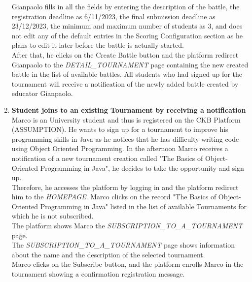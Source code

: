 \begin{enumerate}
		Gianpaolo fills in all the fields by entering the description of the battle, the registration deadline as 6/11/2023, the final submission deadline as 23/12/2023, the minimum
		and maximum number of students as 3, and does not edit any of the default entries in the Scoring Configuration section as he plans to edit it later before the battle is
		actually started.\\
		After that, he clicks on the Create Battle button and the platform redirect Gianpaolo to the \emph{DETAIL\_TOURNAMENT} page containing the new created battle in the list of available battles.
		All students who had signed up for the tournament will receive a notification of the newly added battle created by educator Gianpaolo.

		
		
		\item \textbf{Student joins to an existing Tournament by receiving a notification}\\
		Marco is an University student and thus is registered on the CKB Platform (ASSUMPTION). He wants to sign up for a tournament to improve his programming skills in Java as he notices that he has difficulty writing code using Object Oriented Programming. In the afternoon Marco receives a notification of a new tournament creation called "The Basics of Object-Oriented Programming in Java", he decides to take the opportunity and sign up.\\
Therefore, he accesses the platform by logging in and the platform redirect him to the \emph{HOMEPAGE}. Marco clicks on the record "The Basics of Object-Oriented Programming in Java" listed in the list of available Tournaments for which he is not subscribed.\\
The platform shows Marco the \emph{SUBSCRIPTION\_TO\_A\_TOURNAMENT} page.\\
The \emph{SUBSCRIPTION\_TO\_A\_TOURNAMENT}  page shows information about the name and the description of the selected tournament. \\
Marco clicks on the Subscribe button, and the platform enrolls Marco in the tournament showing a confirmation registration message.


\end{enumerate}
